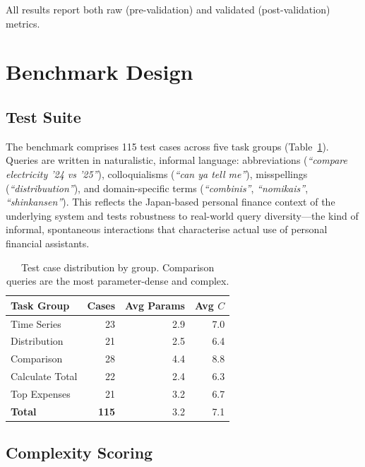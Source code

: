 \documentclass[11pt,twocolumn]{article}
\begin{document}
All results report both raw (pre-validation) and validated (post-validation) metrics.

\section{Benchmark Design}
\label{sec:benchmark}

\subsection{Test Suite}

The benchmark comprises 115 test cases across five task groups (Table~\ref{tab:tc_distribution}).
Queries are written in naturalistic, informal language: abbreviations (\emph{``compare electricity '24 vs '25''}), colloquialisms (\emph{``can ya tell me''}), misspellings (\emph{``distribuution''}), and domain-specific terms (\emph{``combinis''}, \emph{``nomikais''}, \emph{``shinkansen''}).
This reflects the Japan-based personal finance context of the underlying system and tests robustness to real-world query diversity---the kind of informal, spontaneous interactions that characterise actual use of personal financial assistants.

\begin{table}[t]
\centering
\small
\begin{tabular}{@{}lrrr@{}}
\toprule
\textbf{Task Group} & \textbf{Cases} & \textbf{Avg Params} & \textbf{Avg $C$} \\
\midrule
Time Series     & 23 & 2.9 & 7.0 \\
Distribution    & 21 & 2.5 & 6.4 \\
Comparison      & 28 & 4.4 & 8.8 \\
Calculate Total & 22 & 2.4 & 6.3 \\
Top Expenses    & 21 & 3.2 & 6.7 \\
\midrule
\textbf{Total}  & \textbf{115} & 3.2 & 7.1 \\
\bottomrule
\end{tabular}
\caption{Test case distribution by group. Comparison queries are the most parameter-dense and complex.}
\label{tab:tc_distribution}
\end{table}

\subsection{Complexity Scoring}
\end{document}

